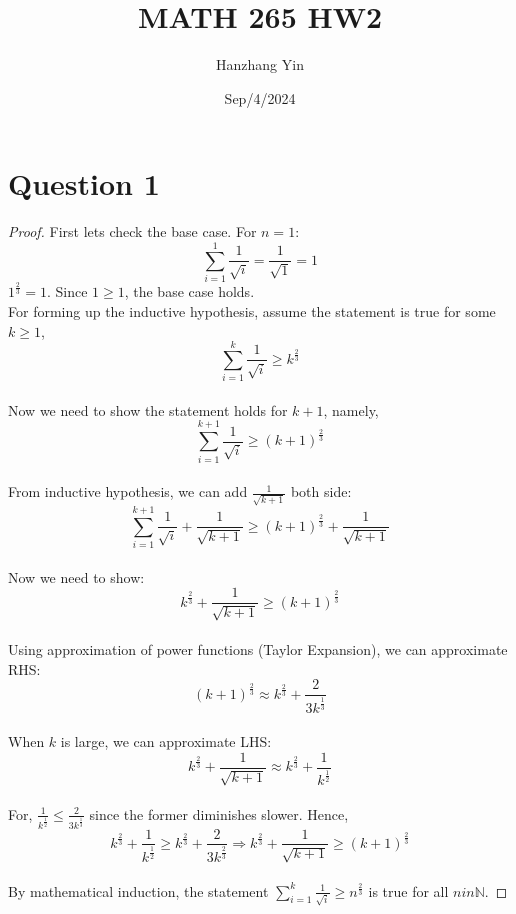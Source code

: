 \documentclass{article}
\title{MATH 265 HW2}
\author{Hanzhang Yin}
\date{Sep/4/2024}
\begin{document}
\maketitle

\section*{Question 1}
\begin{proof}
    First lets check the base case. For $n = 1$: 
    \[ \sum_{i=1}^{1} \frac{1}{\sqrt{i}} = \frac{1}{\sqrt{1}} = 1 \]
    $1^{\frac{2}{3}} = 1$. Since $1 \geq 1$, the base case holds.
    \\
    For forming up the inductive hypothesis, assume the statement is true for some $k \geq 1$, 
    \[ \sum_{i=1}^{k} \frac{1}{\sqrt{i}} \geq k^{\frac{2}{3}}  \]
    \\
    Now we need to show the statement holds for $k + 1$, namely, 
    \[ \sum_{i=1}^{k+1} \frac{1}{\sqrt{i}} \geq (k + 1)^{\frac{2}{3}} \]
    \\
    From inductive hypothesis, we can add $\frac{1}{\sqrt{k+1}}$ both side:
    \[ \sum_{i=1}^{k+1} \frac{1}{\sqrt{i}} + \frac{1}{\sqrt{k + 1}} \geq (k + 1)^{\frac{2}{3}} + \frac{1}{\sqrt{k + 1}} \]
    \\
    Now we need to show:
    \[ k^{\frac{2}{3}} + \frac{1}{\sqrt{k + 1}} \geq (k + 1)^{\frac{2}{3}} \]
    \\
    Using approximation of power functions (Taylor Expansion), we can approximate RHS: 
    \[ (k + 1)^{\frac{2}{3}} \approx k^{\frac{2}{3}} + \frac{2}{3k^{\frac{1}{3}}} \]
    \\
    When $k$ is large, we can approximate LHS:
    \[ k^{\frac{2}{3}} + \frac{1}{\sqrt{k + 1}} \approx k^{\frac{2}{3}} + \frac{1}{k^{\frac{1}{2}}} \]
    \\
    For, \( \frac{1}{k^{\frac{1}{2}}} \leq \frac{2}{3k^{\frac{1}{3}}} \) since the former diminishes slower. Hence,
    \[ k^{\frac{2}{3}} + \frac{1}{k^{\frac{1}{2}}} \geq k^{\frac{2}{3}} + \frac{2}{3 k^{\frac{2}{3}}} \Rightarrow k^{\frac{2}{3}} + \frac{1}{\sqrt{k + 1}} \geq (k + 1)^{\frac{2}{3}} \]
    \\
    By mathematical induction, the statement \( \sum_{i=1}^{k} \frac{1}{\sqrt{i}} \geq n^{\frac{2}{3}} \) is true for all $n in \mathbb{N}$.
\end{proof}
\end{document}
